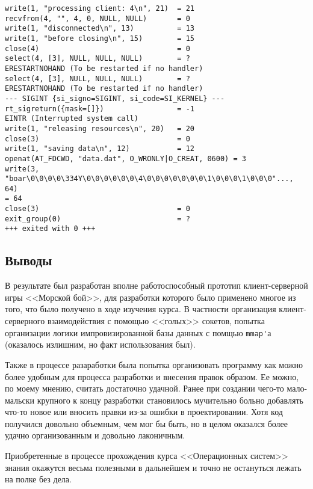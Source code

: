 \documentclass[12pt]{article}
\begin{document}
\begin{verbatim}
write(1, "processing client: 4\n", 21)  = 21
recvfrom(4, "", 4, 0, NULL, NULL)       = 0
write(1, "disconnected\n", 13)          = 13
write(1, "before closing\n", 15)        = 15
close(4)                                = 0
select(4, [3], NULL, NULL, NULL)        = ? 
ERESTARTNOHAND (To be restarted if no handler)
select(4, [3], NULL, NULL, NULL)        = ? 
ERESTARTNOHAND (To be restarted if no handler)
--- SIGINT {si_signo=SIGINT, si_code=SI_KERNEL} ---
rt_sigreturn({mask=[]})                 = -1 
EINTR (Interrupted system call)
write(1, "releasing resources\n", 20)   = 20
close(3)                                = 0
write(1, "saving data\n", 12)           = 12
openat(AT_FDCWD, "data.dat", O_WRONLY|O_CREAT, 0600) = 3
write(3, "boar\0\0\0\0\334Y\0\0\0\0\0\0\4\0\0\0\0\0\0\0\1\0\0\0\1\0\0\0"..., 64)
= 64
close(3)                                = 0
exit_group(0)                           = ?
+++ exited with 0 +++
\end{verbatim}

\subsection*{Выводы}

В результате был разработан вполне работоспособный прототип клиент-серверной игры <<Морской бой>>, для разработки которого было применено многое из того, что было получено в ходе изучения курса. В частности организация клиент-серверного взаимодействия с помощью <<голых>> сокетов, попытка организации логики импровизированной базы данных с помщью \verb|mmap'|а (оказалось излишним, но факт использования был).

Также в процессе разаработки была попытка организовать программу как можно более удобным для процесса разработки и внесения правок образом. Ее можно, по моему мнению, считать достаточно удачной. Ранее при создании чего-то мало-мальски крупного к концу разработки становилось мучительно больно добавлять что-то новое или вносить правки из-за ошибки в проектировании. Хотя код получился довольно объемным, чем мог бы быть, но в целом оказался более удачно организованным и довольно лаконичным.

Приобретенные в процессе прохождения курса <<Операционных систем>> знания окажутся весьма полезными в дальнейшем и точно не остануться лежать на полке без дела.
\end{document}
